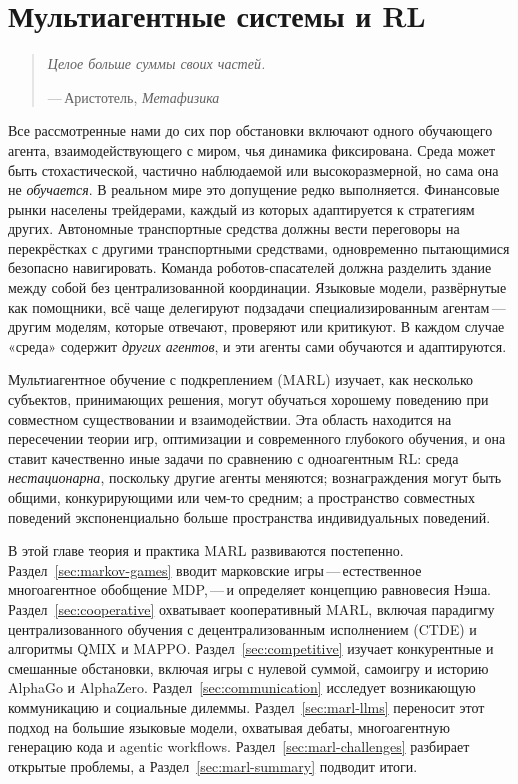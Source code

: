 
\chapter{Мультиагентные системы и RL}
\label{ch:agents}

\begin{quote}
\itshape
Целое больше суммы своих частей.
\par\medskip
\upshape\raggedleft
---\,Аристотель, \textit{Метафизика}
\end{quote}

\bigskip

Все рассмотренные нами до сих пор обстановки включают одного обучающего агента, взаимодействующего
с миром, чья динамика фиксирована. Среда может быть
стохастической, частично наблюдаемой или высокоразмерной, но сама она не
\emph{обучается}. В реальном мире это допущение редко выполняется.
Финансовые рынки населены трейдерами, каждый из которых адаптируется к
стратегиям других. Автономные транспортные средства должны вести переговоры на
перекрёстках с другими транспортными средствами, одновременно пытающимися безопасно
навигировать. Команда роботов-спасателей должна разделить здание между
собой без централизованной координации. Языковые модели, развёрнутые как
помощники, всё чаще делегируют подзадачи специализированным
агентам\,---\,другим моделям, которые отвечают, проверяют или критикуют. В каждом
случае «среда» содержит \emph{других агентов}, и эти агенты
сами обучаются и адаптируются.

Мультиагентное обучение с подкреплением (MARL)
изучает, как несколько субъектов, принимающих решения, могут обучаться хорошему
поведению при совместном существовании и взаимодействии. Эта область находится на
пересечении теории игр, оптимизации и современного глубокого обучения,
и она ставит качественно иные задачи по сравнению с
одноагентным RL: среда \emph{нестационарна}, поскольку
другие агенты меняются; вознаграждения могут быть общими, конкурирующими или
чем-то средним; а пространство совместных поведений экспоненциально больше пространства
индивидуальных поведений.

В этой главе теория и практика MARL развиваются постепенно.
Раздел~\ref{sec:markov-games} вводит марковские игры\,---\,естественное
многоагентное обобщение MDP,\,---\,и определяет концепцию
равновесия Нэша. Раздел~\ref{sec:cooperative}
охватывает кооперативный MARL, включая парадигму централизованного обучения
с децентрализованным исполнением (CTDE) и алгоритмы QMIX и MAPPO.
Раздел~\ref{sec:competitive} изучает конкурентные и
смешанные обстановки, включая игры с нулевой суммой, самоигру и историю
AlphaGo и AlphaZero. Раздел~\ref{sec:communication} исследует
возникающую коммуникацию и социальные дилеммы.
Раздел~\ref{sec:marl-llms} переносит этот подход на большие языковые
модели, охватывая дебаты, многоагентную генерацию кода и agentic
workflows. Раздел~\ref{sec:marl-challenges} разбирает открытые
проблемы, а Раздел~\ref{sec:marl-summary} подводит итоги.

